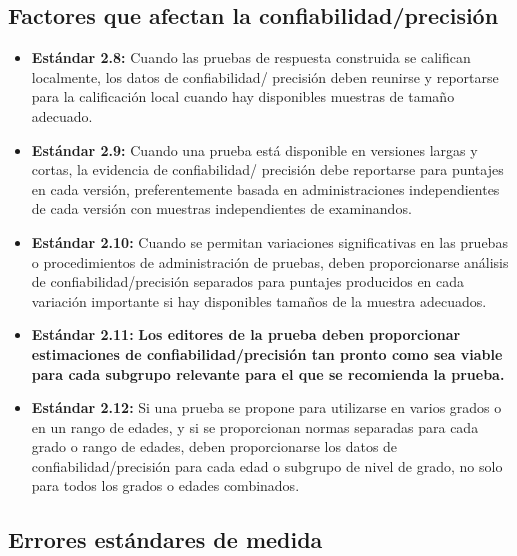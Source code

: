 \documentclass[
  letterpaper,
  DIV=11,
  numbers=noendperiod]{scrreprt}
\providecommand{\tightlist}{%
  \setlength{\itemsep}{0pt}\setlength{\parskip}{0pt}}
\begin{document}
\subsection{Factores que afectan la
confiabilidad/precisión}\label{factores-que-afectan-la-confiabilidadprecisiuxf3n}

\begin{itemize}
\tightlist
\item
  \textbf{Estándar 2.8:} Cuando las pruebas de respuesta construida se
  califican localmente, los datos de confiabilidad/ precisión deben
  reunirse y reportarse para la calificación local cuando hay
  disponibles muestras de tamaño adecuado.
\item
  \textbf{Estándar 2.9:} Cuando una prueba está disponible en versiones
  largas y cortas, la evidencia de confiabilidad/ precisión debe
  reportarse para puntajes en cada versión, preferentemente basada en
  administraciones independientes de cada versión con muestras
  independientes de examinandos.
\item
  \textbf{Estándar 2.10:} Cuando se permitan variaciones significativas
  en las pruebas o procedimientos de administración de pruebas, deben
  proporcionarse análisis de confiabilidad/precisión separados para
  puntajes producidos en cada variación importante si hay disponibles
  tamaños de la muestra adecuados.
\item
  \textbf{Estándar 2.11:} \textbf{Los editores de la prueba deben
  proporcionar estimaciones de confiabilidad/precisión tan pronto como
  sea viable para cada subgrupo relevante para el que se recomienda la
  prueba.}
\item
  \textbf{Estándar 2.12:} Si una prueba se propone para utilizarse en
  varios grados o en un rango de edades, y si se proporcionan normas
  separadas para cada grado o rango de edades, deben proporcionarse los
  datos de confiabilidad/precisión para cada edad o subgrupo de nivel de
  grado, no solo para todos los grados o edades combinados.
\end{itemize}

\subsection{Errores estándares de
medida}\label{errores-estuxe1ndares-de-medida}
\end{document}
